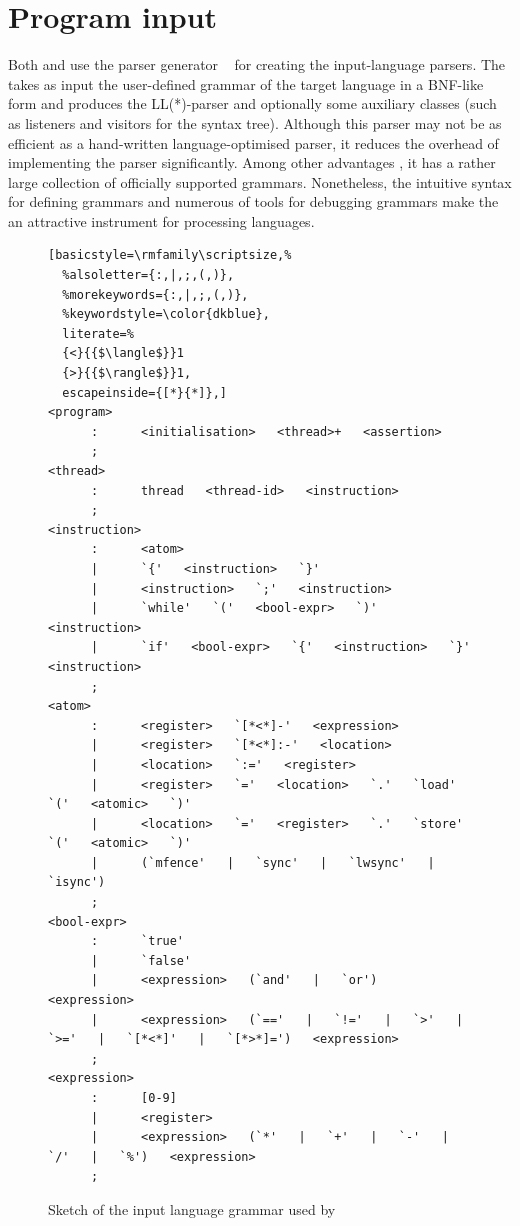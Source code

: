 \section{Program input}
\label{ch:impl:input}

Both \porthos[1] and \porthos[2] use the  parser generator%
%
%
%
~\cite{parr2013definitive} for creating the input-language parsers.
The  takes as input the user-defined grammar of the target language in a BNF-like form and produces the LL(*)-parser and optionally some auxiliary classes (such as listeners and visitors for the syntax tree).
Although this parser may not be as efficient as a hand-written language-optimised parser, it reduces the overhead of implementing the parser significantly.
Among other advantages , it has a rather large collection of officially supported grammars.
Nonetheless, the intuitive syntax for defining grammars and numerous of tools for debugging grammars make the  an attractive instrument for processing languages.

\begin{figure}[t]%
\centering
\begin{minipage}[t]{.6\textwidth}%
\begin{lstlisting}[basicstyle=\rmfamily\scriptsize,%
  %alsoletter={:,|,;,(,)},
  %morekeywords={:,|,;,(,)},
  %keywordstyle=\color{dkblue},
  literate=%
  {<}{{$\langle$}}1
  {>}{{$\rangle$}}1,
  escapeinside={[*}{*]},]
<program>
      :      <initialisation>   <thread>+   <assertion>
      ;
<thread>
      :      thread   <thread-id>   <instruction>
      ;
<instruction>
      :      <atom>
      |      `{'   <instruction>   `}'
      |      <instruction>   `;'   <instruction>
      |      `while'   `('   <bool-expr>   `)'   <instruction>
      |      `if'   <bool-expr>   `{'   <instruction>   `}'   <instruction>
      ;
<atom>   
      :      <register>   `[*<*]-'   <expression>
      |      <register>   `[*<*]:-'   <location>
      |      <location>   `:='   <register>
      |      <register>   `='   <location>   `.'   `load'    `('   <atomic>   `)'
      |      <location>   `='   <register>   `.'   `store'   `('   <atomic>   `)'
      |      (`mfence'   |   `sync'   |   `lwsync'   |   `isync')
      ;
<bool-expr>
      :      `true'
      |      `false'
      |      <expression>   (`and'   |   `or')   <expression>
      |      <expression>   (`=='   |   `!='   |   `>'   |   `>='   |   `[*<*]'   |   `[*>*]=')   <expression>
      ;
<expression>
      :      [0-9]
      |      <register>
      |      <expression>   (`*'   |   `+'   |   `-'   |   `/'   |   `%')   <expression>
      ;
\end{lstlisting}
\end{minipage}
\caption{Sketch of the input language grammar used by \oldporthos{}}
\label{fig:in_grammar_pts}
\end{figure}

